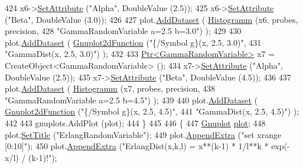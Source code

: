 \begin{DoxyCode}
424     x6->\hyperlink{classns3_1_1ObjectBase_ac60245d3ea4123bbc9b1d391f1f6592f}{SetAttribute} (\textcolor{stringliteral}{"Alpha"}, DoubleValue (2.5));
425     x6->\hyperlink{classns3_1_1ObjectBase_ac60245d3ea4123bbc9b1d391f1f6592f}{SetAttribute} (\textcolor{stringliteral}{"Beta"}, DoubleValue (3.0));
426 
427     plot.\hyperlink{classns3_1_1Gnuplot_a306ec724a327cf9ab699700f31fca0a1}{AddDataset} ( \hyperlink{main-random-variable-stream_8cc_a2cfd3837ab3f2e816cf53486d7a186b5}{Histogramm} (x6, probes, precision,
428                                   \textcolor{stringliteral}{"GammaRandomVariable a=2.5 b=3.0"}) );
429 
430     plot.\hyperlink{classns3_1_1Gnuplot_a306ec724a327cf9ab699700f31fca0a1}{AddDataset} ( \hyperlink{classns3_1_1Gnuplot2dFunction}{Gnuplot2dFunction} (\textcolor{stringliteral}{"\{/Symbol g\}(x, 2.5, 3.0)"},
431                                          \textcolor{stringliteral}{"GammaDist(x, 2.5, 3.0)"}) );
432 
433     \hyperlink{classns3_1_1Ptr}{Ptr<GammaRandomVariable>} x7 = CreateObject<GammaRandomVariable> ();
434     x7->\hyperlink{classns3_1_1ObjectBase_ac60245d3ea4123bbc9b1d391f1f6592f}{SetAttribute} (\textcolor{stringliteral}{"Alpha"}, DoubleValue (2.5));
435     x7->\hyperlink{classns3_1_1ObjectBase_ac60245d3ea4123bbc9b1d391f1f6592f}{SetAttribute} (\textcolor{stringliteral}{"Beta"}, DoubleValue (4.5));
436 
437     plot.\hyperlink{classns3_1_1Gnuplot_a306ec724a327cf9ab699700f31fca0a1}{AddDataset} ( \hyperlink{main-random-variable-stream_8cc_a2cfd3837ab3f2e816cf53486d7a186b5}{Histogramm} (x7, probes, precision,
438                                   \textcolor{stringliteral}{"GammaRandomVariable a=2.5 b=4.5"}) );
439 
440     plot.\hyperlink{classns3_1_1Gnuplot_a306ec724a327cf9ab699700f31fca0a1}{AddDataset} ( \hyperlink{classns3_1_1Gnuplot2dFunction}{Gnuplot2dFunction} (\textcolor{stringliteral}{"\{/Symbol g\}(x, 2.5, 4.5)"},
441                                          \textcolor{stringliteral}{"GammaDist(x, 2.5, 4.5)"}) );
442 
443     gnuplots.AddPlot (plot);
444   \}
445 
446   \{
447     \hyperlink{classns3_1_1Gnuplot}{Gnuplot} \hyperlink{lte__amc_8m_a5942306abe9f005572e4344e3cdef528}{plot};
448     plot.\hyperlink{classns3_1_1Gnuplot_ac01f15633d49f0239f8a45293a1e04f0}{SetTitle} (\textcolor{stringliteral}{"ErlangRandomVariable"});
449     plot.\hyperlink{classns3_1_1Gnuplot_a649a3041b9d0ea21a212b5ad9b28ecbf}{AppendExtra} (\textcolor{stringliteral}{"set xrange [0:10]"});
450     plot.\hyperlink{classns3_1_1Gnuplot_a649a3041b9d0ea21a212b5ad9b28ecbf}{AppendExtra} (\textcolor{stringliteral}{"ErlangDist(x,k,l) = x**(k-1) * 1/l**k * exp(-x/l) / (k-1)!"});

\end{DoxyCode}
